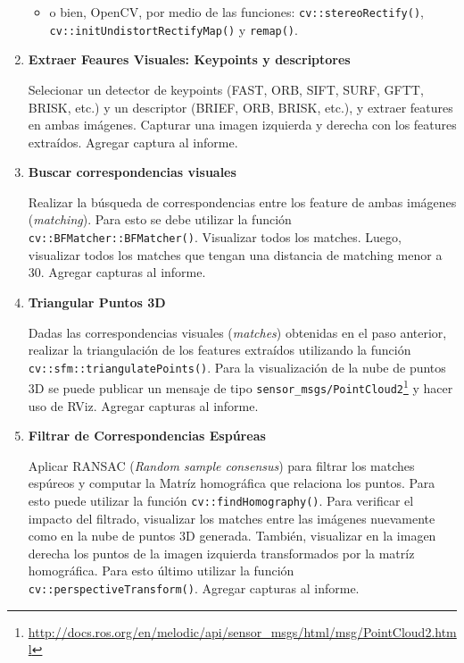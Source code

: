 \documentclass[tp]{lcc}
\begin{document}
\begin{enumerate}
\begin{itemize}
        
        \item o bien, OpenCV, por medio de las funciones: \lstinline{cv::stereoRectify()},  \lstinline{cv::initUndistortRectifyMap()} y  \lstinline{remap()}.
        
    \end{itemize}

\item \textbf{Extraer Feaures Visuales: Keypoints y descriptores}

Selecionar un detector de keypoints (FAST, ORB, SIFT, SURF, GFTT, BRISK, etc.) y un descriptor (BRIEF, ORB, BRISK, etc.), y extraer features en ambas imágenes. Capturar una imagen izquierda y derecha con los features extraídos. Agregar captura al informe.

\item \textbf{Buscar correspondencias visuales}

Realizar la búsqueda de correspondencias entre los feature de ambas imágenes (\emph{matching}). Para esto se debe utilizar la función \lstinline{cv::BFMatcher::BFMatcher()}. Visualizar todos los matches. Luego, visualizar todos los matches que tengan una distancia de matching menor a 30. Agregar capturas al informe.

\item \textbf{Triangular Puntos 3D}

Dadas las correspondencias visuales (\emph{matches}) obtenidas en el paso anterior, realizar la triangulación de los features extraídos utilizando la función \lstinline{cv::sfm::triangulatePoints()}. Para la visualización de la nube de puntos 3D se puede publicar un mensaje de tipo \lstinline{sensor_msgs/PointCloud2}\footnote{\url{http://docs.ros.org/en/melodic/api/sensor_msgs/html/msg/PointCloud2.html}} y hacer uso de RViz. Agregar capturas al informe.

\item \textbf{Filtrar de Correspondencias Espúreas}

Aplicar RANSAC (\emph{Random sample consensus}) para filtrar los matches espúreos y computar la Matríz homográfica que relaciona los puntos. Para esto puede utilizar la función \lstinline{cv::findHomography()}. Para verificar el impacto del filtrado, visualizar los matches entre las imágenes nuevamente como en la nube de puntos 3D generada. También, visualizar en la imagen derecha los puntos de la imagen izquierda transformados por la matríz homográfica. Para esto último utilizar la función  \lstinline{cv::perspectiveTransform()}. Agregar capturas al informe.


\end{enumerate}
\end{document}
